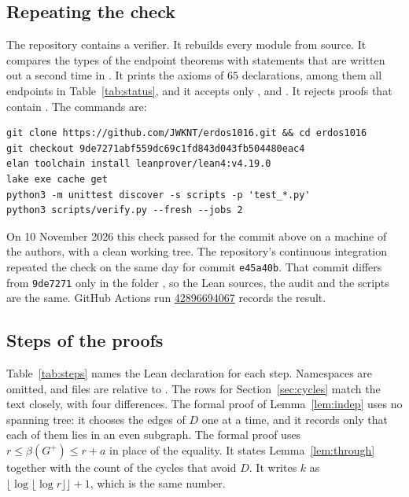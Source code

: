\documentclass[11pt]{article}
\theoremstyle{definition}
\theoremstyle{remark}
\numberwithin{equation}{section}
\begin{document}
\subsection{Repeating the check}

The repository contains a verifier. It rebuilds every module from source. It compares the types of
the endpoint theorems with statements that are written out a second time in
. It prints the axioms of $65$ declarations, among them all endpoints
in Table~\ref{tab:status}, and it accepts only ,  and
. It rejects proofs that contain . The commands are:

{\small
\begin{verbatim}
git clone https://github.com/JWKNT/erdos1016.git && cd erdos1016
git checkout 9de7271abf559dc69c1fd843d043fb504480eac4
elan toolchain install leanprover/lean4:v4.19.0
lake exe cache get
python3 -m unittest discover -s scripts -p 'test_*.py'
python3 scripts/verify.py --fresh --jobs 2
\end{verbatim}}

On 10 November 2026 this check passed for the commit above on a machine of the authors, with a
clean working tree. The repository's continuous integration repeated the check on the same day for
commit \texttt{e45a40b}. That commit differs from \texttt{9de7271} only in the folder
, so the Lean sources, the audit and the scripts are the same. GitHub
Actions run
\href{https://github.com/JWKNT/erdos1016/actions/runs/42896694067}{42896694067} records the
result.

\subsection{Steps of the proofs}

Table~\ref{tab:steps} names the Lean declaration for each step. Namespaces are omitted, and files
are relative to . The rows for Section~\ref{sec:cycles} match the text closely,
with four differences. The formal proof of Lemma~\ref{lem:indep} uses no spanning tree: it chooses
the edges of $D$ one at a time, and it records only that each of them lies in an even subgraph. The
formal proof uses $r\le\beta(G^{+})\le r+a$ in place of the equality. It states
Lemma~\ref{lem:through} together with the count of the cycles that avoid $D$. It writes $k$ as
$\lfloor\log\lfloor\log r\rfloor\rfloor+1$, which is the same number.
\end{document}
